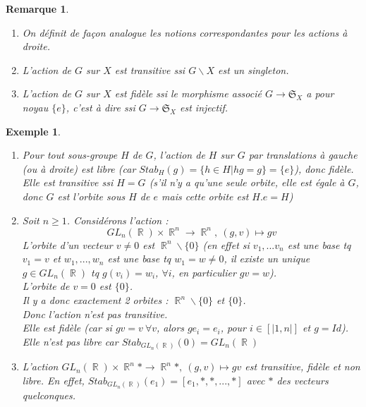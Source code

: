 \documentclass[a4paper, oneside]{report}
\theoremstyle{break}
\newtheorem{exem}[thm]{Exemple}
\newtheorem{remar}[thm]{Remarque}
\newcommand{\x}{\times}
\DeclareMathOperator{\R}{\mathbb{R}}
\renewcommand{\S}{\mathfrak{S}}
\begin{document}
\begin{remar}
	\begin{enumerate}
		\item On définit de façon analogue les notions correspondantes pour les actions à droite.
		\item L'action de $G$ sur $X$ est transitive ssi $G\backslash X$ est un singleton.
		\item L'action de $G$ sur $X$ est fidèle ssi le morphisme associé $G\rightarrow \S_X$ a pour noyau $\{e\}$, c'est à dire ssi $G\rightarrow \S_X$ est injectif.
	\end{enumerate}	
\end{remar}

\begin{exem}
	\begin{enumerate}
		\item Pour tout sous-groupe $H$ de $G$, l'action de $H$ sur $G$ par translations à gauche (ou à droite) est libre (car $Stab_H(g)=\{h\in H |hg=g \}=\{e\}$), donc fidèle.\\
		Elle est transitive ssi $H=G$ (s'il n'y a qu'une seule orbite, elle est égale à $G$, donc $G$ est l'orbite sous $H$ de $e$ mais cette orbite est $H.e=H$)
		\item Soit $n\geq 1$. Considérons l'action :
		$$GL_n(\R)\x \R^n \rightarrow \R^n,~(g,v)\mapsto gv $$
		L'orbite d'un vecteur $v\neq 0$ est $\R^n\backslash \{0\}$ (en effet si $v_1,...v_n$ est une base tq $v_1 = v$ et $w_1,...,w_n$ est une base tq $w_1=w\neq 0$, il existe un unique $g\in GL_n(\R)$ tq $g(v_i)=w_i$, $\forall i$, en particulier $gv=w$).\\
		L'orbite de $v=0$ est $\{0\}$.\\
		Il y a donc exactement 2 orbites : $\R^n\backslash \{0\}$ et $\{0\}$.\\
		Donc l'action n'est pas transitive.\\
		Elle est fidèle (car si $gv=v~\forall v$, alors $ge_i=e_i$, pour $i\in [|1,n|]$ et $g=Id$).\\
		Elle n'est pas libre car $Stab_{GL_n(\R)}(0)=GL_n(\R)$
		
		\item L'action $GL_n(\R)\x \R^n* \rightarrow \R^n*,~(g,v)\mapsto gv $ est transitive, fidèle et non libre. En effet, $Stab_{GL_n(\R)}(e_1)=[e_1,*,*,...,*]$ avec $*$ des vecteurs quelconques.
		

\end{enumerate}
\end{exem}
\end{document}
